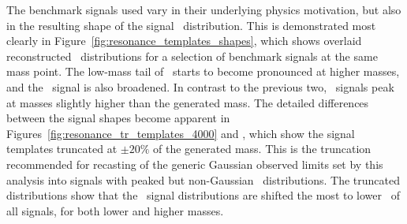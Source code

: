 The benchmark signals used vary in their underlying physics motivation, but also in the resulting shape of the signal \mjj\ distribution. 
This is demonstrated most clearly in Figure~\ref{fig:resonance_templates_shapes}, which shows overlaid reconstructed \mjj\ distributions for a selection of benchmark signals at the same mass point.
The low-mass tail of \Wprime\ starts to become pronounced at higher masses, and the \qstar\ signal is also broadened. 
In contrast to the previous two, \BlackMax\ signals peak at masses slightly higher than the generated mass. 
The detailed differences between the signal shapes become apparent in Figures~\ref{fig:resonance_tr_templates_4000} and , 
which show the signal templates truncated at $\pm 20 \%$ of the generated mass. 
This is the truncation recommended for recasting of the generic Gaussian observed limits set by this analysis into signals with peaked but non-Gaussian \mjj\ distributions. 
The truncated distributions show that the \qstar\ signal distributions are shifted the most to lower \mjj\ of all signals, for both lower and higher masses. 
% 
% 
